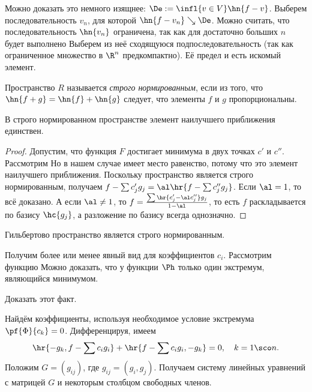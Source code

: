 \documentclass[a4paper]{article}
\begin{document}
\begin{note}
Можно доказать это немного изящнее: $\De := \infl{v\in V}
\hn{f-v}$. Выберем последовательность $v_n$, для которой $\hn{f - v_n}
\searrow \De$. Можно считать, что последовательность $\hn{v_n}$
ограничена, так как для достаточно больших $n$ будет выполнено
  Выберем из
неё сходящуюся подпоследовательность (так как ограниченное множество в
$\R^n$ предкомпактно). Её предел и есть искомый элемент.
\end{note}

\begin{df}
Пространство $R$ называется \emph{строго нормированным}, если из того,
что $\hn{f+g} = \hn{f} + \hn{g}$ следует, что элементы $f$ и $g$
пропорциональны.
\end{df}

\begin{theorem}
В строго нормированном пространстве элемент наилучшего приближения
единствен.
\end{theorem}
\begin{proof}
Допустим, что функция $F$ достигает минимума в двух точках $c'$ и
$c''$.  Рассмотрим   Но в нашем случае имеет место
равенство, потому что это элемент наилучшего приближения.  Поскольку
пространство является строго нормированным, получаем $f - \sum c'_j
g_j = \al\hr{f - \sum c''_j g_j}$.  Если $\al = 1$, то всё доказано. А
если $\al \neq 1$, то $f = \frac{\sum \hr{c'_j - \al
    c''_j}g_j}{1-\al}$, то есть $f$ раскладывается по базису
$\hc{g_j}$, а разложение по базису всегда однозначно.
\end{proof}


\begin{problem}
Гильбертово пространство является строго нормированным.
\end{problem}

Получим более или менее явный вид для коэффициентов $c_i$.  Рассмотрим
функцию   Можно доказать, что у функции $\Ph$ только один
экстремум, являющийся минимумом.
\begin{problem}
Доказать этот факт.
\end{problem}
Найдём коэффициенты, используя необходимое условие экстремума
$\pf{\Phi}{c_k} = 0$.  Дифференцируя, имеем
$$\hr{-g_k, f- \sum c_i g_i} + \hr{f - \sum c_i g_i, -g_k} = 0, \quad
k = 1\sco n.$$ Положим $G = (g_{ij})$, где $g_{ij} = (g_i, g_j)$.
Получаем систему линейных уравнений с матрицей $G$ и некоторым
столбцом свободных членов.
\end{document}
